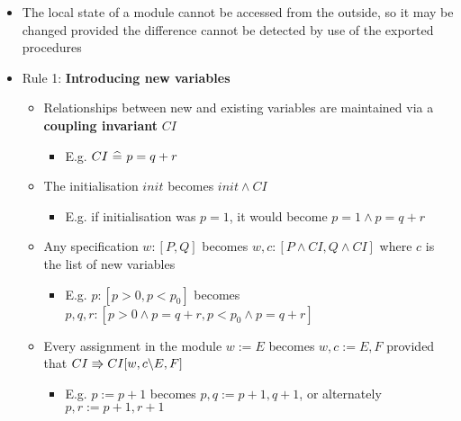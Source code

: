 \begin{itemize}
	
	\item The local state of a module cannot be accessed from the outside, so it may be changed provided the difference cannot be detected by use of the exported procedures
	
	\item Rule 1: \textbf{Introducing new variables}
	
	\begin{itemize}
		
		\item Relationships between new and existing variables are maintained via a \textbf{coupling invariant} $ CI $
		
		\begin{itemize}
			
			\item E.g. $ CI ~ \widehat{=} ~ p = q + r $
			
		\end{itemize}
		
		\item The initialisation $ init $ becomes $ init \land CI $
		
		\begin{itemize}
			
			\item E.g. if initialisation was $ p = 1 $, it would become $ p = 1 \land p = q + r $
			
		\end{itemize}
		
		\item Any specification $ w : [P, Q] $ becomes $ w, c : [P \land CI, Q \land CI] $ where $ c $ is the list of new variables
		
		\begin{itemize}
			
			\item E.g. $ p : [p > 0, p < p_0]  $ becomes $ p, q, r : [p > 0 \land p = q + r, p < p_0 \land p = q + r] $
			
		\end{itemize}
		
		\item Every assignment in the module $ w := E $ becomes $ w, c := E, F $ provided that $ CI \Rrightarrow CI[w, c \backslash E, F] $
		
		\begin{itemize}
			
			\item E.g. $ p := p + 1 $ becomes $ p, q := p + 1, q + 1 $, or alternately $ p, r := p + 1, r + 1 $
			

\end{itemize}
\end{itemize}
\end{itemize}
